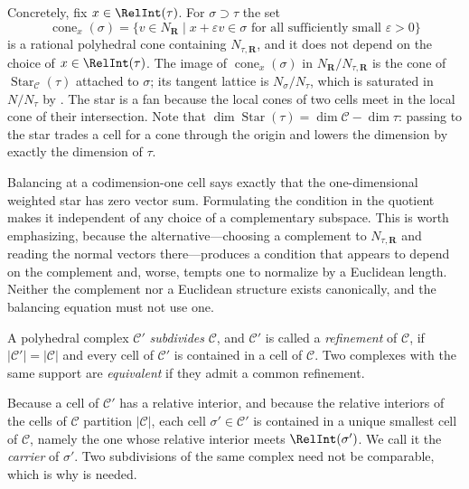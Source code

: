 Concretely, fix $x\in\RelInt(\tau)$.  For $\sigma\supset\tau$ the set
\[
 \operatorname{cone}_x(\sigma)
 =\{v\in N_{\mathbf R}\mid x+\varepsilon v\in\sigma
    \text{ for all sufficiently small }\varepsilon>0\}
\]
is a rational polyhedral cone containing $N_{\tau,\mathbf R}$, and it does
not depend on the choice of $x\in\RelInt(\tau)$.  The image of
$\operatorname{cone}_x(\sigma)$ in $N_{\mathbf R}/N_{\tau,\mathbf R}$ is the
cone of $\operatorname{Star}_{\mathscr C}(\tau)$ attached to $\sigma$; its
tangent lattice is $N_\sigma/N_\tau$, which is saturated in $N/N_\tau$ by
.  The star is a fan because the local cones
of two cells meet in the local cone of their intersection.  Note that
$\dim\operatorname{Star}(\tau)=\dim\mathscr C-\dim\tau$: passing to the star
trades a cell for a cone through the origin and lowers the dimension by
exactly the dimension of $\tau$.

Balancing at a codimension-one cell says exactly that the one-dimensional weighted star has
zero vector sum.  Formulating the condition in the quotient makes it
independent of any choice of a complementary subspace.  This is worth
emphasizing, because the alternative---choosing a complement to
$N_{\tau,\mathbf R}$ and reading the normal vectors there---produces a
condition that appears to depend on the complement and, worse, tempts one to
normalize by a Euclidean length.  Neither the complement nor a Euclidean
structure exists canonically, and the balancing equation must not use one.

\begin{definition}
\label{def:ch10-subdivision}
A polyhedral complex $\mathscr C'$ \emph{subdivides} $\mathscr C$, and
$\mathscr C'$ is called a \emph{refinement} of $\mathscr C$, if
$|\mathscr C'|=|\mathscr C|$ and every cell of $\mathscr C'$ is contained in
a cell of $\mathscr C$.  Two complexes with the same support are
\emph{equivalent} if they admit a common refinement.
\end{definition}

Because a cell of $\mathscr C'$ has a relative interior, and because the
relative interiors of the cells of $\mathscr C$ partition $|\mathscr C|$,
each cell $\sigma'\in\mathscr C'$ is contained in a unique smallest cell of
$\mathscr C$, namely the one whose relative interior meets
$\RelInt(\sigma')$.  We call it the \emph{carrier} of $\sigma'$.  Two
subdivisions of the same complex need not be comparable, which is why
 is needed.

